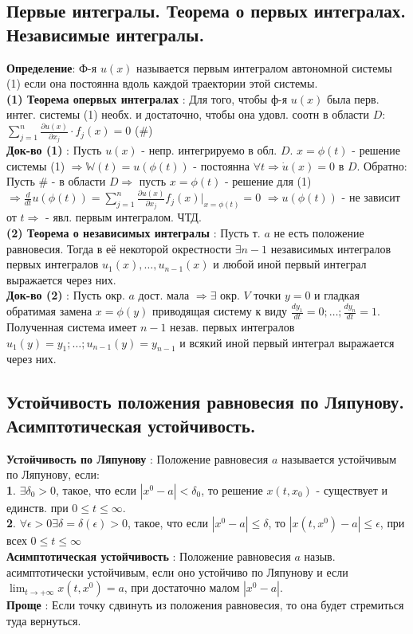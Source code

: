 \documentclass[unicode, 8pt, a4paper,oneside, landscape]{article}
\begin{document}
\begin{multicols}{4}
\subsection{Первые интегралы. Теорема о первых интегралах. Независимые интегралы.}
{\bf Определение}: Ф-я $u(x)$ называется первым интегралом автономной системы (1) если она постоянна вдоль каждой траектории этой системы.\\
{\bf (1) Теорема опервых интегралах} : Для того, чтобы ф-я $u(x)$ была перв. интег. системы (1) необх. и достаточно, чтобы она удовл. соотн в области $D$: $\sum_{j=1}^n \frac{\partial u(x)}{\partial x_j}\cdot f_j(x) = 0$ (\#)\\
{\bf Док-во (1)} : Пусть $u(x)$ - непр. интегрируемо в обл. $D$. $x = \phi(t)$ - решение системы (1) $\Rightarrow \mathbb{W}(t) = u(\phi(t))$ - постоянна $\forall t \Rightarrow \dot{u}(x) = 0$ в $D$. Обратно: Пусть \# - в области $D \Rightarrow$ пусть $x = \phi(t)$ - решение для (1) $\Rightarrow \frac{d}{dt}u(\phi(t)) = \sum_{j=1}^n \frac{\partial u(x)}{\partial x_j}f_j(x)|_{x = \phi(t)} = 0$ $\Rightarrow u(\phi(t))$ - не зависит от $t \Rightarrow$ - явл. первым интегралом. ЧТД.\\
{\bf (2) Теорема о независимых интегралы} : Пусть т. $a$ не есть положение равновесия. Тогда в её некоторой окрестности $\exists n-1$ независимых интегралов первых интегралов $u_1(x), \ldots, u_{n-1}(x)$ и любой иной первый интеграл выражается через них.\\
{\bf Док-во (2)} : Пусть окр. $a$ дост. мала $\Rightarrow \exists$ окр. $V$ точки $y=0$ и гладкая обратимая замена $x = \phi(y)$ приводящая систему к виду $\frac{dy_1}{dt} = 0; \ldots; \frac{dy_n}{dt} = 1$. Полученная система имеет $n-1$ незав. первых интегралов $u_1(y) = y_1; \ldots; u_{n-1}(y) = y_{n-1}$ и всякий иной первый интеграл выражается через них. 


\subsection{Устойчивость положения равновесия по Ляпунову. Асимптотическая устойчивость.}

{\bf Устойчивость по Ляпунову} : Положение равновесия $a$ называется устойчивым по Ляпунову, если: \\
{\bf 1}. $\exists \delta_0 > 0$, такое, что если $|x^0 - a| < \delta_0$, то решение $x(t, x_0)$ - существует и единств. при $0\leq t \leq \infty$.\\
{\bf 2}. $\forall \epsilon > 0 \exists \delta = \delta(\epsilon) > 0$, такое, что если $|x^0 - a| \leq \delta$, то $|x(t, x^0) - a| \leq \epsilon$, при всех $0\leq t \leq \infty$\\
{\bf Асимптотическая устойчивость} : Положение равновесия $a$ назыв. асимптотически устойчивым, если оно устойчиво по Ляпунову и если $\lim_{t \to +\infty} x(t, x^0) = a$, при достаточно малом $|x^0 - a|$.\\
{\bf Проще} : Если точку сдвинуть из положения равновесия, то она будет стремиться туда вернуться.  


\end{multicols}
\end{document}
